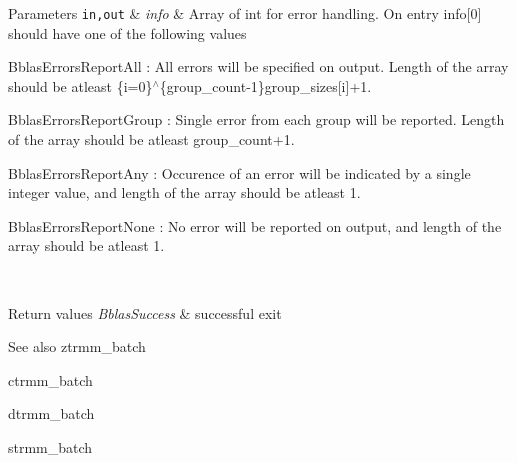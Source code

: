 \begin{DoxyParams}[1]{Parameters}
\hline
\mbox{\tt in,out}  & {\em info} & Array of int for error handling. On entry info\mbox{[}0\mbox{]} should have one of the following values
\begin{DoxyItemize}
\item Bblas\+Errors\+Report\+All \+: All errors will be specified on output. Length of the array should be atleast \{i=0\}$^\wedge$\{group\+\_\+count-\/1\}group\+\_\+sizes\mbox{[}i\mbox{]}+1.
\item Bblas\+Errors\+Report\+Group \+: Single error from each group will be reported. Length of the array should be atleast group\+\_\+count+1.
\item Bblas\+Errors\+Report\+Any \+: Occurence of an error will be indicated by a single integer value, and length of the array should be atleast 1.
\item Bblas\+Errors\+Report\+None \+: No error will be reported on output, and length of the array should be atleast 1.
\end{DoxyItemize}\\
\hline
\end{DoxyParams}

\begin{DoxyRetVals}{Return values}
{\em Bblas\+Success} & successful exit\\
\hline
\end{DoxyRetVals}
\begin{DoxySeeAlso}{See also}
ztrmm\+\_\+batch 

ctrmm\+\_\+batch 

dtrmm\+\_\+batch 

strmm\+\_\+batch 
\end{DoxySeeAlso}
